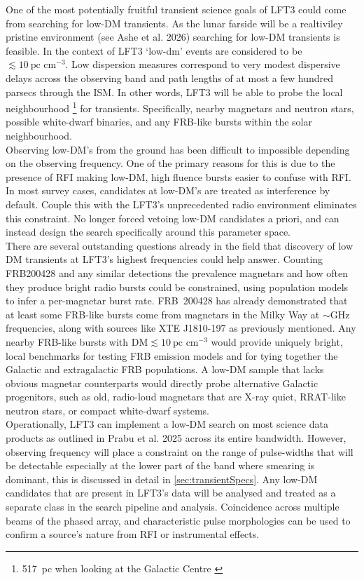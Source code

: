 One of the most potentially fruitful transient science goals of LFT3 could come from searching for low-DM transients. As the lunar farside will be a realtiviley pristine environment (see Ashe et al. 2026) searching for low-DM transients is feasible. In the context of LFT3 `low-dm' events are considered to be $\lesssim10~\text{pc cm}^{-3}$. Low dispersion measures correspond to very modest dispersive delays across the observing band and path lengths of at most a few hundred parsecs through the ISM. In other words, LFT3 will be able to probe the local neighbourhood \footnote{517~pc when looking at the Galactic Centre \citep{ocker_ne2025_2026}} for transients. Specifically, nearby magnetars and neutron stars, possible white-dwarf binaries, and any FRB-like bursts within the solar neighbourhood. \\ 

Observing low-DM's from the ground has been difficult to impossible depending on the observing frequency. One of the primary reasons for this is due to the presence of RFI making low-DM, high fluence bursts easier to confuse with RFI. In most survey cases, candidates at low-DM's are treated as interference by default. Couple this with the
LFT3's unprecedented radio environment eliminates this constraint. No longer forced vetoing low-DM candidates a priori, and can instead design the search specifically around this parameter space. \\ 

There are several outstanding questions already in the field that discovery of low DM transients at LFT3's highest frequencies could help answer. Counting FRB200428 and any similar detections the prevalence magnetars and how often they produce bright radio bursts could be constrained, using population models to infer a per-magnetar burst rate.  FRB~200428 has already demonstrated that at least some FRB-like bursts come from magnetars in the Milky Way at $\sim$GHz frequencies, along with sources like XTE J1810-197 as previously mentioned.  Any nearby FRB-like bursts with $\mathrm{DM}  \lesssim 10~\text{pc cm}^{-3}$ would provide uniquely bright, local benchmarks for testing FRB emission models and for tying together the Galactic and extragalactic FRB populations. A low-DM sample that lacks obvious magnetar counterparts would directly probe alternative Galactic progenitors, such as old, radio-loud magnetars that are X-ray quiet, RRAT-like neutron stars, or compact white-dwarf systems.\\

Operationally, LFT3 can implement a low-DM search on most science data products as outlined in Prabu et al. 2025 across its entire bandwidth. However, observing frequency will place a constraint on the range of pulse-widths that will be detectable especially at the lower part of the band where smearing is dominant, this is discussed in detail in \cref{sec:transientSpecs}. Any low-DM candidates that are present in LFT3's data will be analysed and treated as a separate class in the search pipeline and analysis. Coincidence across multiple beams of the phased array, and characteristic pulse morphologies can be used to confirm a source's nature from RFI or instrumental effects.\\

